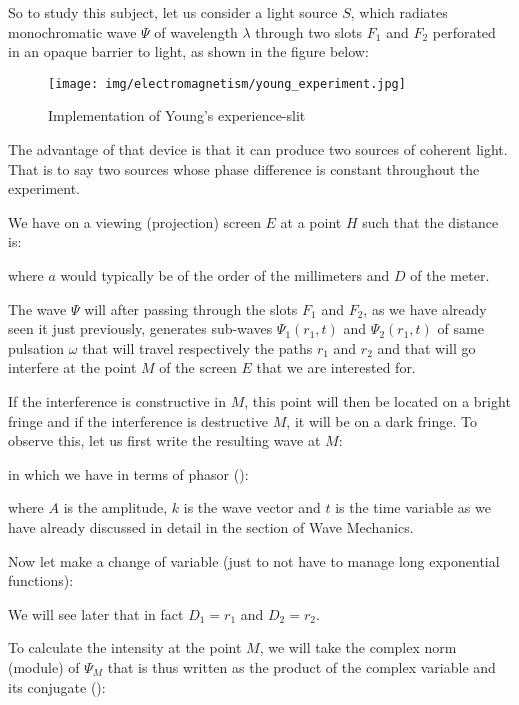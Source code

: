 	So to study this subject, let us consider a light source $S$, which radiates monochromatic wave $\Psi$ of wavelength $\lambda$ through two slots $F_1$ and $F_2$ perforated  in an opaque barrier to light, as shown in the figure below:
	\begin{figure}[H]
		\centering
		\texttt{[image: img/electromagnetism/young\_experiment.jpg]}
		\caption{Implementation of Young's experience-slit}
	\end{figure}
	
	\begin{tcolorbox}[title=Remark,colframe=black,arc=10pt]
	The advantage of that device is that it can produce two sources of coherent light. That is to say two sources whose phase difference is constant throughout the experiment.
	\end{tcolorbox}
	We have on a viewing (projection) screen $E$ at a point $H$ such that the distance is:
	
	where $a$ would typically be of the order of the millimeters and $D$ of the meter.
	
	The wave $\Psi$ will after passing through the slots $F_1$ and $F_2$, as we have already seen it just previously, generates sub-waves $\Psi_1(r_1,t)$ and $\Psi_2(r_1,t)$ of same pulsation $\omega$ that will travel respectively the paths $r_1$ and $r_2$ and that will go interfere at the point $M$ of the screen $E$ that we are interested for.
	
	If the interference is constructive in $M$, this point will then be located on a bright fringe and if the interference is destructive $M$, it will be on a dark fringe. To observe this, let us first write the resulting wave at $M$:
	
	in which we have in terms of phasor ():
	
	where $A$ is the amplitude, $k$ is the wave vector and $t$ is the time variable as we have already discussed in detail in the section of Wave Mechanics.

	Now let make a change of variable (just to not have to manage long exponential functions):
	
	\begin{tcolorbox}[title=Remark,colframe=black,arc=10pt]
	We will see later that in fact $D_1=r_1$ and $D_2=r_2$.
	\end{tcolorbox}
	To calculate the intensity at the point $M$, we will take the complex norm (module) of $\Psi_M$ that is thus written as the product of the complex variable and its conjugate ():
	

